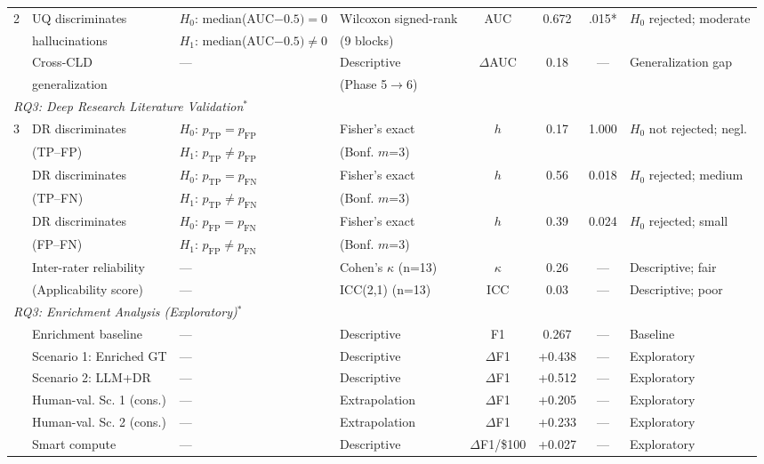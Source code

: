 \begin{table}[H]
\begin{threeparttable}
{\begin{tabular}{llp{3.2cm}p{2.8cm}cccl}
\midrule
2 & UQ discriminates & $H_0$: median(AUC$-0.5)=0$ & Wilcoxon signed-rank & AUC & 0.672 & .015* & $H_0$ rejected; moderate \\
 & hallucinations & $H_1$: median(AUC$-0.5)\neq 0$ & (9 blocks) &  &  &  &  \\
 & Cross-CLD & --- & Descriptive & $\Delta$AUC & 0.18 & --- & Generalization gap \\
 & generalization &  & (Phase 5$\to$6) &  &  &  &  \\
\midrule
\multicolumn{8}{l}{\textit{RQ3: Deep Research Literature Validation}$^{\ast}$} \\
\midrule
3 & DR discriminates & $H_0$: $p_{\text{TP}}=p_{\text{FP}}$ & Fisher's exact & $h$ & 0.17 & 1.000 & $H_0$ not rejected; negl. \\
 & (TP--FP) & $H_1$: $p_{\text{TP}}\neq p_{\text{FP}}$ & (Bonf. $m$=3) &  &  &  &  \\
 & DR discriminates & $H_0$: $p_{\text{TP}}=p_{\text{FN}}$ & Fisher's exact & $h$ & 0.56 & 0.018 & $H_0$ rejected; medium \\
 & (TP--FN) & $H_1$: $p_{\text{TP}}\neq p_{\text{FN}}$ & (Bonf. $m$=3) &  &  &  &  \\
 & DR discriminates & $H_0$: $p_{\text{FP}}=p_{\text{FN}}$ & Fisher's exact & $h$ & 0.39 & 0.024 & $H_0$ rejected; small \\
 & (FP--FN) & $H_1$: $p_{\text{FP}}\neq p_{\text{FN}}$ & (Bonf. $m$=3) &  &  &  &  \\
 & Inter-rater reliability & --- & Cohen's $\kappa$ (n=13) & $\kappa$ & 0.26 & --- & Descriptive; fair \\
 & (Applicability score) & --- & ICC(2,1) (n=13) & ICC & 0.03 & --- & Descriptive; poor \\
\midrule
\multicolumn{8}{l}{\textit{RQ3: Enrichment Analysis (Exploratory)}$^{\ast}$} \\
\midrule
 & Enrichment baseline & --- & Descriptive & F1 & 0.267 & --- & Baseline \\
 & Scenario 1: Enriched GT & --- & Descriptive & $\Delta$F1 & +0.438 & --- & Exploratory \\
 & Scenario 2: LLM+DR & --- & Descriptive & $\Delta$F1 & +0.512 & --- & Exploratory \\
 & Human-val. Sc. 1 (cons.) & --- & Extrapolation & $\Delta$F1 & +0.205 & --- & Exploratory \\
 & Human-val. Sc. 2 (cons.) & --- & Extrapolation & $\Delta$F1 & +0.233 & --- & Exploratory \\
 & Smart compute & --- & Descriptive & $\Delta$F1/\$100 & +0.027 & --- & Exploratory \\

\end{tabular}}
\end{threeparttable}
\end{table}
